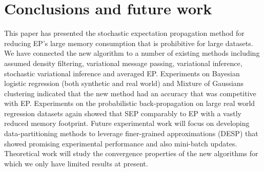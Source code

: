 \section{Conclusions and future work}
This paper has presented the stochastic expectation propagation method for reducing EP's large memory consumption that is prohibitive for large datasets. We have connected the new algorithm to a number of existing methods including assumed density filtering, variational message passing, variational inference, stochastic variational inference and averaged EP.
%
Experiments on Bayesian logistic regression (both synthetic and real world) and Mixture of Gaussians clustering indicated that the new method had an accuracy that was competitive with EP.  Experiments on the probabilistic back-propagation on large real world regression datasets again showed that SEP comparably to EP with a vastly reduced memory footprint. 
%
Future experimental work will focus on developing data-partitioning methods to leverage finer-grained approximations (DESP) that showed promising experimental performance and also mini-batch updates. Theoretical work will study the convergence properties of the new algorithms for which we only have limited results at present.